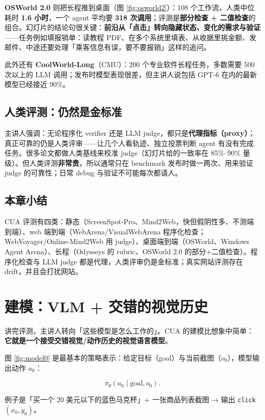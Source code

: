 ﻿\documentclass[a4paper]{article}
\begin{document}
\textbf{OSWorld 2.0} 则把长程推到桌面（图 \ref{fig:osworld2}）：108 个工作流，人类中位耗时 \textbf{1.6 小时}，一个 agent 平均要 \textbf{318 次调用}；评测是\textbf{部分检查 + 二值检查}的组合。幻灯片的结论句很关键：\textbf{前沿从「点击」转向隐藏状态、变化的需求与验证}——任务例如填报销单：读教程 PDF、在多个系统里填表、从收据里挑金额、发邮件、中途还要处理「乘客信息有误，要不要报销」这样的追问。

此外还有 \textbf{CoolWorld-Long}（CMU）：200 个专业软件长程任务，多数需要 500 次以上的 LLM 调用；发布时模型表现很差，但主讲人说包括 GPT-6 在内的最新模型已经接近 90\%。

\subsection{人类评测：仍然是金标准}

主讲人强调：无论程序化 verifier 还是 LLM judge，都只是\textbf{代理指标（proxy）}；真正可靠的仍是人类评审——让几个人看轨迹、独立投票判断 agent 有没有完成任务。很多论文都做人类基线来校准 judge（幻灯片给的一致率在 85\%–90\% 量级）。但人类评测\textbf{非常贵}，所以通常只在 benchmark 发布时做一两次、用来验证 judge 的可靠性；日常 debug 与验证不可能每次都请人。

\subsection{本章小结}
CUA 评测有四类：静态（ScreenSpot-Pro、Mind2Web，快但假阴性多、不测端到端）、web 端到端（WebArena/VisualWebArena 程序化检查；WebVoyager/Online-Mind2Web 用 judge）、桌面端到端（OSWorld、Windows Agent Arena）、长程（Odysseys 的 rubric、OSWorld 2.0 的部分+二值检查）。程序化检查与 LLM judge 都是代理，人类评审仍是金标准；真实网站评测存在 drift，并且会打扰网站。

\section{建模：VLM + 交错的视觉历史}

讲完评测，主讲人转向「这些模型是怎么工作的」。CUA 的建模比想象中简单：\textbf{它就是一个接受交错视觉/动作历史的视觉语言模型}。

图 \ref{fig:model0} 是最基本的策略表示：给定目标（goal）与当前截图（$o_0$），模型输出动作 $a_0$：

$$
\pi_\theta(a_0 \mid \text{goal}, o_0).
$$

例子是「买一个 20 美元以下的蓝色马克杯」+ 一张商品列表截图 → 输出 \texttt{click}$(x_0, y_0)$。
\end{document}
